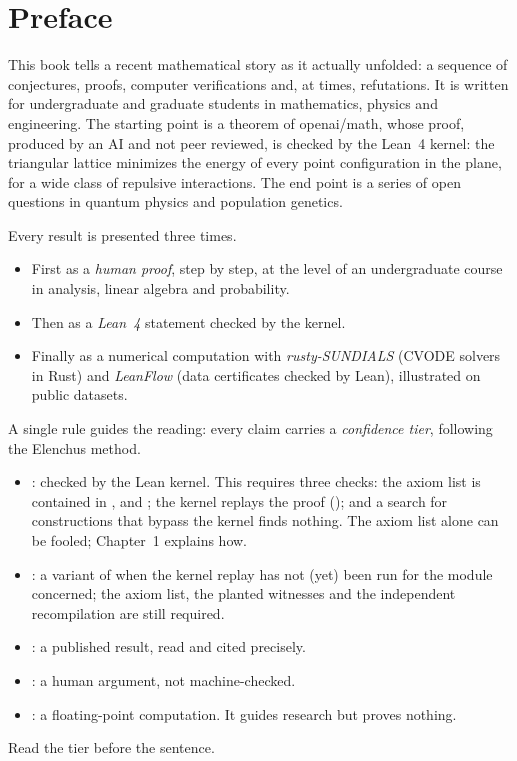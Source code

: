 \chapter*{Preface}
This book tells a recent mathematical story as it actually unfolded: a sequence of conjectures, proofs, computer
verifications and, at times, refutations. It is written for undergraduate and graduate students in mathematics,
physics and engineering. The starting point is a theorem of openai/math, whose proof, produced by an AI and not peer
reviewed, is checked by the Lean~4 kernel: the triangular lattice minimizes the energy of every point configuration in
the plane, for a wide class of repulsive interactions. The end point is a series of open questions in quantum physics
and population genetics.

Every result is presented three times.
\begin{itemize}
\item First as a \emph{human proof}, step by step, at the level of an undergraduate course in analysis, linear algebra
and probability.
\item Then as a \emph{Lean~4} statement checked by the kernel.
\item Finally as a numerical computation with \emph{rusty-SUNDIALS} (CVODE solvers in Rust) and \emph{LeanFlow}
(data certificates checked by Lean), illustrated on public datasets.
\end{itemize}

A single rule guides the reading: every claim carries a \emph{confidence tier}, following the Elenchus method.
\begin{itemize}
\item \tierA{}: checked by the Lean kernel. This requires three checks: the axiom list is contained in
,  and ; the kernel replays the proof (); and
a search for constructions that bypass the kernel finds nothing. The axiom list alone can be fooled; Chapter~1
explains how.
\item \tierAs{}: a variant of \tierA{} when the kernel replay has not (yet) been run for the module concerned; the
axiom list, the planted witnesses and the independent recompilation are still required.
\item \tierL{}: a published result, read and cited precisely.
\item \tierC{}: a human argument, not machine-checked.
\item \tierX{}: a floating-point computation. It guides research but proves nothing.
\end{itemize}
Read the tier before the sentence.

